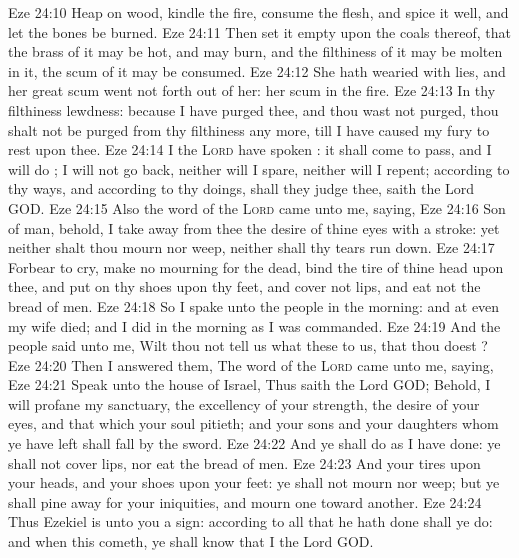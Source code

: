 \vs Eze 24:10 Heap on wood, kindle the fire, consume the flesh, and spice it well, and let the bones be burned.
\vs Eze 24:11 Then set it empty upon the coals thereof, that the brass of it may be hot, and may burn, and  the filthiness of it may be molten in it,  the scum of it may be consumed.
\vs Eze 24:12 She hath wearied  with lies, and her great scum went not forth out of her: her scum  in the fire.
\vs Eze 24:13 In thy filthiness  lewdness: because I have purged thee, and thou wast not purged, thou shalt not be purged from thy filthiness any more, till I have caused my fury to rest upon thee.
\vs Eze 24:14 I the \textsc{Lord} have spoken : it shall come to pass, and I will do ; I will not go back, neither will I spare, neither will I repent; according to thy ways, and according to thy doings, shall they judge thee, saith the Lord GOD.
\vs Eze 24:15 Also the word of the \textsc{Lord} came unto me, saying,
\vs Eze 24:16 Son of man, behold, I take away from thee the desire of thine eyes with a stroke: yet neither shalt thou mourn nor weep, neither shall thy tears run down.
\vs Eze 24:17 Forbear to cry, make no mourning for the dead, bind the tire of thine head upon thee, and put on thy shoes upon thy feet, and cover not  lips, and eat not the bread of men.
\vs Eze 24:18 So I spake unto the people in the morning: and at even my wife died; and I did in the morning as I was commanded.
\vs Eze 24:19 And the people said unto me, Wilt thou not tell us what these  to us, that thou doest ?
\vs Eze 24:20 Then I answered them, The word of the \textsc{Lord} came unto me, saying,
\vs Eze 24:21 Speak unto the house of Israel, Thus saith the Lord GOD; Behold, I will profane my sanctuary, the excellency of your strength, the desire of your eyes, and that which your soul pitieth; and your sons and your daughters whom ye have left shall fall by the sword.
\vs Eze 24:22 And ye shall do as I have done: ye shall not cover  lips, nor eat the bread of men.
\vs Eze 24:23 And your tires  upon your heads, and your shoes upon your feet: ye shall not mourn nor weep; but ye shall pine away for your iniquities, and mourn one toward another.
\vs Eze 24:24 Thus Ezekiel is unto you a sign: according to all that he hath done shall ye do: and when this cometh, ye shall know that I  the Lord GOD.
